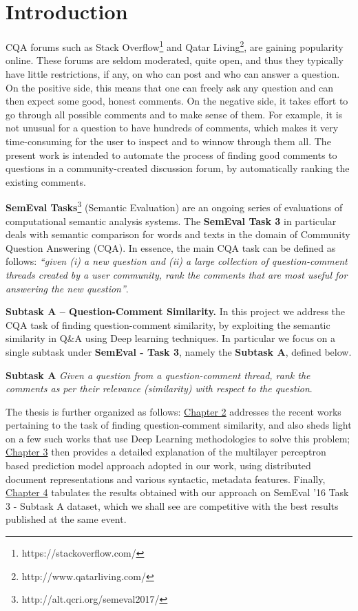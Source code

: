 \documentclass[12pt, a4paper, oneside]{Thesis} %
\newcommand{\mychapter}[2]{
    \setcounter{chapter}{#1}
    \setcounter{section}{0}
    \chapter*{#2}
    \addcontentsline{toc}{chapter}{#2}
    \lhead{\emph{#2}}
}
\begin{document}

\mychapter{1}{Introduction}

CQA forums such as Stack Overflow\footnote{https://stackoverflow.com/} and Qatar Living\footnote{http://www.qatarliving.com/}, are gaining popularity online. These forums are seldom moderated, quite open, and thus they typically have little restrictions, if any, on who can post and who can answer a question. On the positive side, this means that one can freely ask any question and can then expect some good, honest comments. On the negative side, it takes effort to go through all possible comments and to make sense of them. For example, it is not unusual for a question to have hundreds of comments, which makes it very time-consuming for the user to inspect and to winnow through them all. The present work is intended to automate the process of finding good comments to questions in a community-created discussion forum, by automatically ranking the existing comments.

\textbf{SemEval Tasks}\footnote{http://alt.qcri.org/semeval2017/} (Semantic Evaluation) are an ongoing series of evaluations of computational semantic analysis systems. The \textbf{SemEval Task 3} in particular deals with semantic comparison for words and texts in the domain of Community Question Answering (CQA). In essence, the main CQA task can be defined as follows: \textit{“given (i) a new question and (ii) a large collection of question-comment threads created by a user community, rank the comments that are most useful for answering the new question”}.

\textbf{Subtask A -- Question-Comment Similarity.} In this project we address the CQA task of finding question-comment similarity, by exploiting the semantic similarity in Q\&A using Deep learning techniques. In particular we focus on a single subtask under \textbf{SemEval - Task 3}, namely the \textbf{Subtask A}, defined below.

\textbf{Subtask A} \textit{Given a question from a question-comment thread, rank the comments as per their relevance (similarity) with respect to the question}.

The thesis is further organized as follows: \hyperref[chap:lit-survery]{Chapter 2} addresses the recent works pertaining to the task of finding question-comment similarity, and also sheds light on a few such works that use Deep Learning methodologies to solve this problem; \hyperref[chap:approach]{Chapter 3} then provides a detailed explanation of the multilayer perceptron based prediction model approach adopted in our work, using distributed document representations and various syntactic, metadata features. Finally, \hyperref[chap:exp]{Chapter 4} tabulates the results obtained with our approach on SemEval '16 Task 3 - Subtask A dataset, which we shall see are competitive with the best results published at the same event.
\end{document}
